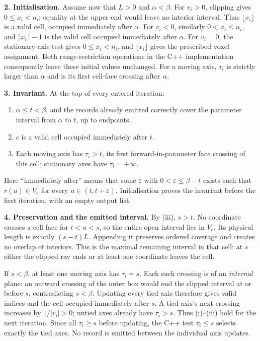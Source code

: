 \textbf{2. Initialisation.}
Assume now that $L>0$ and $\alpha<\beta$.
For $v_i>0$, clipping gives $0\leq x_i<n_i$: equality at the upper end
would leave no interior interval. Thus $\lfloor x_i\rfloor$ is a valid
cell, occupied immediately after $\alpha$. For $v_i<0$, similarly
$0<x_i\leq n_i$, and $\lceil x_i\rceil-1$ is the valid cell occupied
immediately after $\alpha$. For $v_i=0$, the stationary-axis test gives
$0\leq x_i<n_i$, and $\lfloor x_i\rfloor$ gives the prescribed voxel assignment.
Both range-restriction operations in the C++ implementation consequently
leave these initial values unchanged.
For a moving axis, $\tau_i$ is strictly larger than $\alpha$ and is its
first cell-face crossing after $\alpha$.

\textbf{3. Invariant.}
At the top of every entered iteration:
\begin{enumerate}[label=(\roman*)]
 \item $\alpha\leq t<\beta$, and the records already emitted correctly
 cover the parameter interval from $\alpha$ to $t$, up to endpoints.
 \item $c$ is a valid cell occupied immediately after $t$.
 \item Each moving axis has $\tau_i>t$, its first forward-in-parameter
 face crossing of this cell; stationary axes have $\tau_i=+\infty$.
\end{enumerate}
Here ``immediately after'' means that some $\varepsilon$ with
$0<\varepsilon\leq\beta-t$ exists such that $r(u)\in V_c$ for every
$u\in(t,t+\varepsilon)$. Initialisation proves the invariant before
the first iteration, with an empty output list.

\textbf{4. Preservation and the emitted interval.}
By (iii), $s>t$. No coordinate crosses a cell face for $t<u<s$, so the
entire open interval lies in $V_c$. Its physical length is exactly
$(s-t)L$. Appending it preserves ordered coverage and creates no overlap
of interiors. This is the maximal remaining interval in that cell:
at $s$ either the clipped ray ends or at least one coordinate leaves the cell.

If $s<\beta$, at least one moving axis has $\tau_i=s$.
Each such crossing is of an \emph{internal} plane: an outward crossing of
the outer box would end the clipped interval at or before $s$, contradicting
$s<\beta$. Updating every tied axis therefore gives valid indices and the
cell occupied immediately after $s$. A tied axis's next crossing increases
by $1/|v_i|>0$; untied axes already have $\tau_i>s$.
Thus (i)--(iii) hold for the next iteration. Since all $\tau_i\geq s$
before updating, the C++ test $\tau_i\leq s$ selects exactly the tied axes.
No record is emitted between the individual axis updates.

